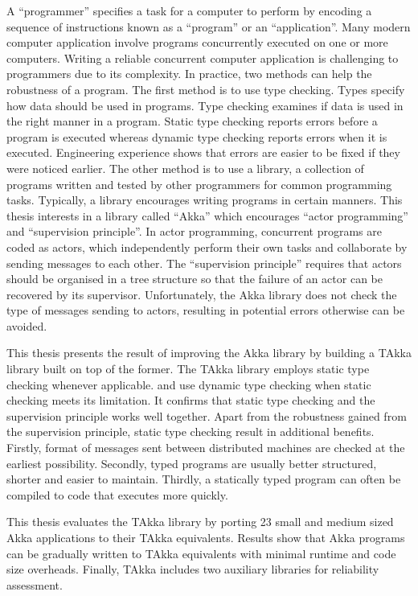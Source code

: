 \documentclass[mphil, 12 pt]{csthesis}
\begin{document}
A ``programmer'' specifies a task for a computer to perform by encoding a sequence of instructions known as a ``program'' or an ``application''.  Many modern computer application  involve programs concurrently executed on one or more computers.  Writing a reliable concurrent computer application is challenging to programmers due to its complexity.  In practice, two methods can help the robustness of a program.  The first method is to use type checking.  Types specify how data should be used in programs.  Type checking examines if data is used in the right manner in a program.  Static type checking reports errors before a program is executed whereas dynamic type checking reports errors when it is executed.  Engineering experience shows that errors are easier to be fixed if they were noticed earlier.   The other method is to use a library, a collection of programs written and tested by other programmers for common programming tasks.  Typically, a library encourages writing programs in certain manners.  This thesis interests in a library called ``Akka'' which encourages ``actor programming'' and ``supervision principle''.  In actor programming, concurrent programs are coded as actors, which independently perform their own tasks and collaborate by sending messages to each other.  The ``supervision principle'' requires that actors should be organised in a tree structure so that the failure of an actor can be recovered by its supervisor.  Unfortunately, the Akka library does not check the type of messages sending to actors, resulting in potential errors otherwise can be avoided.

This thesis presents the result of improving the Akka library by building a TAkka library built on top of the former.  The TAkka library employs static type checking whenever applicable. and use dynamic type checking when static checking meets its limitation.  It confirms that static type checking and the supervision principle works well together.  Apart from the robustness gained from the supervision principle, static type checking result in additional benefits.   Firstly, format of messages sent between distributed machines are checked at the earliest possibility.  Secondly, typed programs are usually better structured, shorter and easier to maintain.  Thirdly, a statically typed program can often be compiled to code that executes
more quickly.

This thesis evaluates the TAkka library by porting 23 small and medium sized Akka applications to their TAkka equivalents. Results show that Akka programs can be gradually written to TAkka equivalents with minimal runtime and code size overheads. Finally, TAkka includes two auxiliary libraries for reliability assessment.
\end{document}
